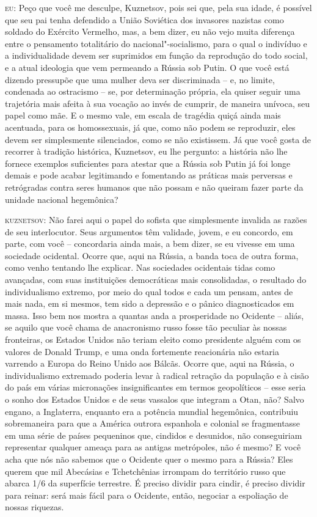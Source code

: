 \textsc{eu:} Peço que você me desculpe, Kuznetsov, pois sei que, pela
sua idade, é possível que seu pai tenha defendido a União Soviética dos
invasores nazistas como soldado do Exército Vermelho, mas, a bem dizer,
eu não vejo muita diferença entre o pensamento totalitário do
nacional"-socialismo, para o qual o indivíduo e a individualidade devem
ser suprimidos em função da reprodução do todo social, e a atual
ideologia que vem permeando a Rússia sob Putin. O que você está dizendo
pressupõe que uma mulher deva ser discriminada -- e, no limite,
condenada ao ostracismo -- se, por determinação própria, ela quiser
seguir uma trajetória mais afeita à sua vocação ao invés de cumprir, de
maneira unívoca, seu papel como mãe. E o mesmo vale, em escala de
tragédia quiçá ainda mais acentuada, para os homossexuais, já que, como
não podem se reproduzir, eles devem ser simplesmente silenciados, como
se não existissem. Já que você gosta de recorrer à tradição histórica,
Kuznetsov, eu lhe pergunto: a história não lhe fornece exemplos
suficientes para atestar que a Rússia sob Putin já foi longe demais e
pode acabar legitimando e fomentando as práticas mais perversas e
retrógradas contra seres humanos que não possam e não queiram fazer
parte da unidade nacional hegemônica?

\textsc{kuznetsov:} Não farei aqui o papel do sofista que simplesmente
invalida as razões de seu interlocutor. Seus argumentos têm validade,
jovem, e eu concordo, em parte, com você -- concordaria ainda mais, a
bem dizer, se eu vivesse em uma sociedade ocidental. Ocorre que, aqui na
Rússia, a banda toca de outra forma, como venho tentando lhe explicar.
Nas sociedades ocidentais tidas como avançadas, com suas instituições
democráticas mais consolidadas, o resultado do individualismo extremo,
por meio do qual todos e cada um pensam, antes de mais nada, em si
mesmos, tem sido a depressão e o pânico diagnosticados em massa. Isso
bem nos mostra a quantas anda a prosperidade no Ocidente -- aliás, se
aquilo que você chama de anacronismo russo fosse tão peculiar às nossas
fronteiras, os Estados Unidos não teriam eleito como presidente alguém
com os valores de Donald Trump, e uma onda fortemente reacionária não
estaria varrendo a Europa do Reino Unido aos Bálcãs. Ocorre que, aqui na
Rússia, o individualismo extremado poderia levar à radical retração da
população e à cisão do país em várias micronações insignificantes em
termos geopolíticos -- esse seria o sonho dos Estados Unidos e de seus
vassalos que integram a Otan, não? Salvo engano, a Inglaterra, enquanto
era a potência mundial hegemônica, contribuiu sobremaneira para que a
América outrora espanhola e colonial se fragmentasse em uma série de
países pequeninos que, cindidos e desunidos, não conseguiriam
representar qualquer ameaça para as antigas metrópoles, não é mesmo? E
você acha que nós não sabemos que o Ocidente quer o mesmo para a Rússia?
Eles querem que mil Abecásias e Tchetchênias irrompam do território
russo que abarca 1/6 da superfície terrestre. É preciso dividir para
cindir, é preciso dividir para reinar: será mais fácil para o Ocidente,
então, negociar a espoliação de nossas riquezas.

